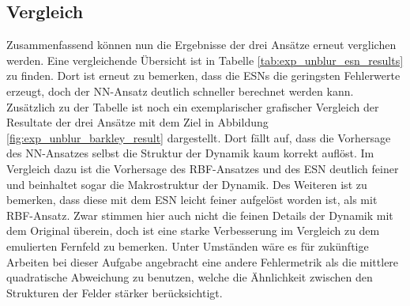 \FloatBarrier
\subsection{Vergleich}
Zusammenfassend können nun die Ergebnisse der drei Ansätze erneut verglichen werden. Eine vergleichende Übersicht ist in Tabelle \ref{tab:exp_unblur_esn_results} zu finden. Dort ist erneut zu bemerken, dass die \textsc{ESN}s die geringsten Fehlerwerte erzeugt, doch der \textsc{NN}-Ansatz deutlich schneller berechnet werden kann.\\
Zusätzlich zu der Tabelle ist noch ein exemplarischer grafischer Vergleich der Resultate der drei Ansätze mit dem Ziel in Abbildung \ref{fig:exp_unblur_barkley_result} dargestellt. Dort fällt auf, dass die Vorhersage des \textsc{NN}-Ansatzes selbst die Struktur der Dynamik kaum korrekt auflöst. Im Vergleich dazu ist die Vorhersage des \textsc{RBF}-Ansatzes und des \textsc{ESN} deutlich feiner und beinhaltet sogar die Makrostruktur der Dynamik. Des Weiteren ist zu bemerken, dass diese mit dem \textsc{ESN} leicht feiner aufgelöst worden ist, als mit \textsc{RBF}-Ansatz. Zwar stimmen hier auch nicht die feinen Details der Dynamik mit dem Original überein, doch ist eine starke Verbesserung im Vergleich zu dem emulierten Fernfeld zu bemerken. Unter Umständen wäre es für zukünftige Arbeiten bei dieser Aufgabe angebracht eine andere Fehlermetrik als die mittlere quadratische Abweichung zu benutzen, welche die Ähnlichkeit zwischen den Strukturen der Felder stärker berücksichtigt. 


